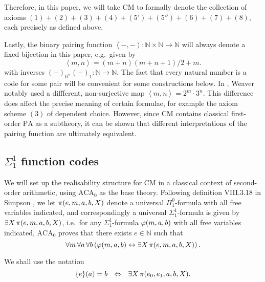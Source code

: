\documentclass[11pt]{article}
\theoremstyle{plain}
\theoremstyle{definition}
\newcommand{\tuple}[1]{\left\langle #1 \right\rangle}
\begin{document}
Therefore, in this paper, we will take $\mathrm{CM}$ to formally denote the collection of axioms $\left(1\right) + \left(2\right) + \left(3\right) + \left(4\right) + \left(5'\right) + \left(5''\right) + \left(6\right) + \left(7\right) + \left(8\right)$, each precisely as defined above.

Lastly, the binary pairing function $\tuple{{-}, {-}} : \mathbb{N} \times \mathbb{N} \rightarrow \mathbb{N}$ will always denote a fixed bijection in this paper, e.g.\ given by
\[\tuple{m, n} = \left(m + n\right)\left(m + n + 1\right) / 2 + m.\]
with inverses $\left(-\right)_0, \left(-\right)_1 : \mathbb{N} \rightarrow \mathbb{N}$. The fact that every natural number is a code for some pair will be convenient for some constructions below. In \cite{weaver09-cm}, Weaver notably used a diffferent, non-surjective map $\tuple{m, n} = 2^m \cdot 3^n$. This difference does affect the precise meaning of certain formulae, for example the axiom scheme $\left(3\right)$ of dependent choice. However, since $\mathrm{CM}$ contains classical first-order $\mathrm{PA}$ as a subtheory, it can be shown that different interpretations of the pairing function are ultimately equivalent.

\subsection{\texorpdfstring{$\Sigma^1_1$}{Sigma(1, 1)} function codes}

We will set up the realisability structure for $\mathrm{CM}$ in a classical context of second-order arithmetic, using $\mathrm{ACA}_0$ as the base theory. Following definition VIII.3.18 in Simpson \cite{simpson09-soa}, we let $\pi\mleft(e, m, a, b, X\mright)$ denote a universal $\Pi^0_1$-formula with all free variables indicated, and correspondingly a universal $\Sigma^1_1$-formula is given by $\exists X \, \pi\mleft(e, m, a, b, X\mright)$, i.e.\ for any $\Sigma^1_1$-formula $\varphi\mleft(m, a, b\mright)$ with all free variables indicated, $\mathrm{ACA}_0$ proves that there exists $e \in \mathbb{N}$ such that
\[\forall m \, \forall a \, \forall b \left(\varphi\mleft(m, a, b\mright) \leftrightarrow \exists X \, \pi\mleft(e, m, a, b, X\mright)\right).\]

We shall use the notation
\[\mleft\{e\mright\}\mleft(a\mright) = b \ \ \ratio\Leftrightarrow \ \ \exists X \, \pi\mleft(e_0, e_1, a, b, X\mright).\]
\end{document}
